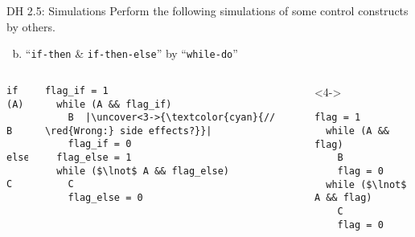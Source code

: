 \begin{frame}[fragile]{}
  \begin{exampleblock}{DH 2.5: Simulations}
    Perform the following simulations of some control constructs by others.
    \begin{enumerate}[(a)]
      \setcounter{enumi}{(1)}
      \item ``\texttt{if-then} \& \texttt{if-then-else}'' by ``\texttt{while-do}''
    \end{enumerate}
  \end{exampleblock}

  \begin{columns}
      \begin{lstlisting}[style = Cstyle, backgroundcolor = \color{teal!10!lightgray}]
  if (A)
    B
  else
    C
      \end{lstlisting}

      \pause
      \begin{lstlisting}[style = Cstyle]
  flag_if = 1
  while (A && flag_if)
    B  |\uncover<3->{\textcolor{cyan}{// \red{Wrong:} side effects?}}|
    flag_if = 0
  flag_else = 1
  while ($\lnot$ A && flag_else)
    C
    flag_else = 0
      \end{lstlisting}

      \begin{onlyenv}<4->
      \begin{lstlisting}[style = Cstyle]
  flag = 1
  while (A && flag)
    B
    flag = 0
  while ($\lnot$ A && flag)
    C
    flag = 0
      \end{lstlisting}
      \end{onlyenv}
  \end{columns}
\end{frame}
